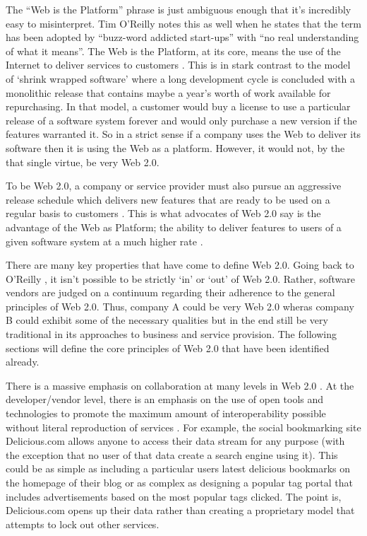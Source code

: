 The ``Web is the Platform'' phrase is just ambiguous enough that it's incredibly
easy to misinterpret.  Tim O'Reilly \citeyearpar{oreilly2007} notes this as well when
he states that the term has been adopted by ``buzz-word addicted start-ups''
with ``no real understanding of what it means''.  The Web is the Platform, at
its core, means the use of the Internet to deliver services to customers
\citep{miller2005}.  This is in stark contrast to the model of `shrink wrapped
software' where a long development cycle is concluded with a monolithic release
that contains maybe a year's worth of work available for repurchasing.  In that
model, a customer would buy a license to use a particular release of a software
system forever and would only purchase a new version if the features warranted
it.  So in a strict sense if a company uses the Web to deliver its software then
it is using the Web as a platform.  However, it would not, by the that single
virtue, be very Web 2.0.

To be Web 2.0, a company or service provider must also pursue an aggressive
release schedule which delivers new features that are ready to be used on a
regular basis to customers \citep{miller2005}.  This is what advocates of Web
2.0 say is the advantage of the Web as Platform; the ability to deliver features
to users of a given software system at a much higher rate \citep{oreilly2007}.

There are many key properties that have come to define Web 2.0.  Going back to
O'Reilly \citeyearpar{oreilly2007}, it isn't possible to be strictly `in' or
`out' of Web 2.0.  Rather, software vendors are judged on a continuum regarding
their adherence to the general principles of Web 2.0.  Thus, company A could be
very Web 2.0 wheras company B could exhibit some of the necessary qualities but
in the end still be very traditional in its approaches to business and service
provision.  The following sections will define the core principles of Web 2.0
that have been identified already.

There is a massive emphasis on collaboration at many levels in Web 2.0
\citep{oreilly2007}.  At the developer/vendor level, there is an emphasis on the
use of open tools and technologies to promote the maximum amount of
interoperability possible without literal reproduction of services
\citep{miller2005}.  For example, the social bookmarking site Delicious.com
allows anyone to access their data stream for any purpose (with the exception
that no user of that data create a search engine using it).  This could be as
simple as including a particular users latest delicious bookmarks on the
homepage of their blog or as complex as designing a popular tag portal that
includes advertisements based on the most popular tags clicked.  The point is,
Delicious.com opens up their data rather than creating a proprietary model that
attempts to lock out other services.

